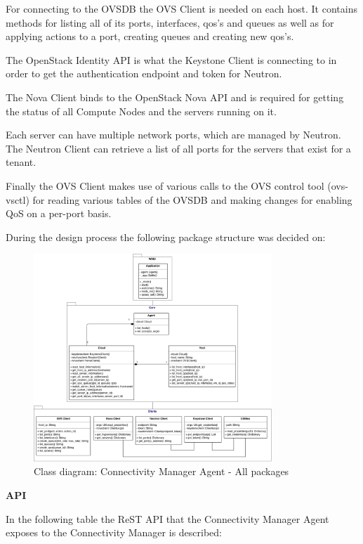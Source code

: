 For connecting to the OVSDB the OVS Client is needed on each host. It contains methods for listing all of its ports, interfaces, qos's and queues as well as for applying actions to a port, creating queues and creating new qos's.

The OpenStack Identity API is what the Keystone Client is connecting to in order to get the authentication endpoint and token for Neutron.

The Nova Client binds to the OpenStack Nova API and is required for getting the status of all Compute Nodes and the servers running on it.

Each server can have multiple network ports, which are managed by Neutron. The Neutron Client can retrieve a list of all ports for the servers that exist for a tenant.

Finally the OVS Client makes use of various calls to the OVS control tool (ovs-vsctl) for reading various tables of the OVSDB and making changes for enabling QoS on a per-port basis.

During the design process the following package structure was decided on:

\begin{figure}[H]
\centering

\includegraphics[width=0.8\textwidth]{images/design/cm_agent_class_diagram}

\caption{Class diagram: Connectivity Manager Agent - All packages}
\end{figure}


\textbf{API}

In the following table the ReST API that the Connectivity Manager Agent exposes to the Connectivity Manager is described:

